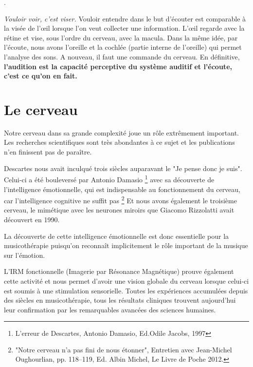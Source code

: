 \autocite{lemonde.fr:stradivarius}.
% 

\autocite[p. 43]{roque:lecoute}

 \emph{Vouloir voir, c'est viser.}  Vouloir entendre dans le but d'écouter est comparable  à
la visée de l'\oe il lorsque l'on veut collecter une information. L'\oe il regarde avec la rétine et  vise, sous l'ordre du cerveau, avec la macula. Dans la même idée, par l'écoute, nous avons l'oreille et la cochlée (partie interne de l'oreille) qui permet l'analyse des sons. A nouveau, il faut une commande du cerveau.
En définitive, \textbf{ l'audition est la capacité perceptive du système auditif et l'écoute, c'est ce qu'on en fait.}

\section  {Le cerveau}

Notre cerveau  dans sa grande complexité joue un rôle extrêmement important.
Les recherches scientifiques sont très abondantes à ce sujet et les publications n'en finissent pas de paraître.


Descartes nous avait inculqué trois siècles auparavant le "Je pense donc je suis". Celui-ci  a 
été bouleversé par Antonio Damasio \footnote {{L'erreur de Descartes}, Antonio Damasio, 
Ed.Odile Jacobs, 1997} 
avec sa découverte de l'intelligence émotionnelle, qui est indispensable au fonctionnement 
du 
cerveau, car  l'intelligence cognitive ne suffit pas%
\footnote{"Notre cerveau n'a pas fini de nous étonner", Entretien avec Jean-Michel 
     Oughourlian, pp. 118--119, Ed. Albin Michel, Le Livre de Poche 2012.}
Et nous avons  également le troisième cerveau, le mimétique avec les neurones miroirs que Giacomo Rizzolatti avait découvert en 1990.
 
La découverte de cette intelligence  émotionnelle est donc essentielle  pour la 
musicothérapie puisqu'on reconnaît implicitement le rôle important de la musique sur 
l'émotion.  

L'IRM fonctionnelle 
(Imagerie par Résonance Magnétique) prouve également cette activité et nous  permet d'avoir 
une vision 
globale du cerveau lorsque celui-ci est soumis à une stimulation 
sensorielle. Toutes les expériences accumulées depuis des siècles en musicothérapie,
tous les résultats cliniques trouvent aujourd'hui leur confirmation par les remarquables
avancées des sciences humaines. 

